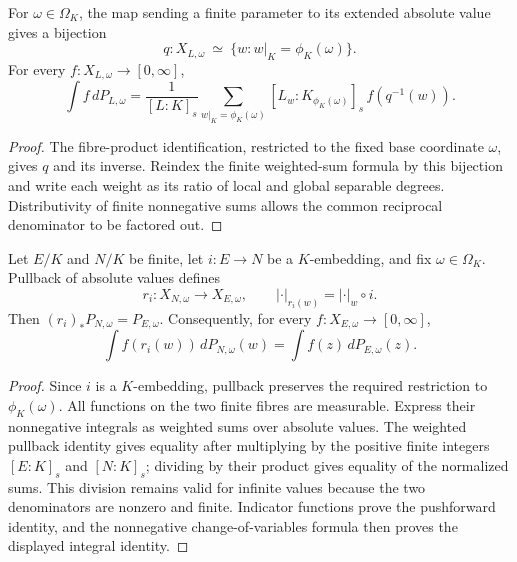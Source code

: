 \begin{lemma}
\label{lem:finite-absolute-fibre-sums}
\leanok
{}
For $\omega\in\Omega_K$, the map sending a finite parameter to its
extended absolute value gives a bijection
\[
 q:X_{L,\omega}\ \simeq\ \{w:w|_K=\phi_K(\omega)\}.
\]
For every $f:X_{L,\omega}\to[0,\infty]$,
\[
 \int f\,dP_{L,\omega}
 =\frac1{[L:K]_s}\sum_{w|_K=\phi_K(\omega)}
     [L_w:K_{\phi_K(\omega)}]_s\,f(q^{-1}(w)).
\]
\end{lemma}
\begin{proof}
The fibre-product identification, restricted to the fixed base
coordinate $\omega$, gives $q$ and its inverse. Reindex the finite
weighted-sum formula by this bijection and write each weight as its
ratio of local and global separable degrees. Distributivity of finite
nonnegative sums allows the common reciprocal denominator to be
factored out.
\end{proof}


\begin{lemma}
\label{lem:finite-fibre-embedding-naturality}
\leanok
{}
Let $E/K$ and $N/K$ be finite, let $i:E\to N$ be a $K$-embedding,
and fix $\omega\in\Omega_K$. Pullback of absolute values defines
\[
 r_i:X_{N,\omega}\longrightarrow X_{E,\omega},
 \qquad |\cdot|_{r_i(w)}=|\cdot|_w\circ i.
\]
Then $(r_i)_*P_{N,\omega}=P_{E,\omega}$. Consequently, for every
$f:X_{E,\omega}\to[0,\infty]$,
\[
 \int f(r_i(w))\,dP_{N,\omega}(w)=\int f(z)\,dP_{E,\omega}(z).
\]
\end{lemma}
\begin{proof}
Since $i$ is a $K$-embedding, pullback preserves the required restriction
to $\phi_K(\omega)$. All functions on the two finite fibres are
measurable. Express their nonnegative integrals as weighted sums over
absolute values. The weighted pullback identity gives equality after
multiplying by the positive finite integers $[E:K]_s$ and $[N:K]_s$;
dividing by their product gives equality of the normalized sums.
This division remains valid for infinite values because the two
denominators are nonzero and finite. Indicator functions prove the
pushforward identity, and the nonnegative change-of-variables formula
then proves the displayed integral identity.
\end{proof}

